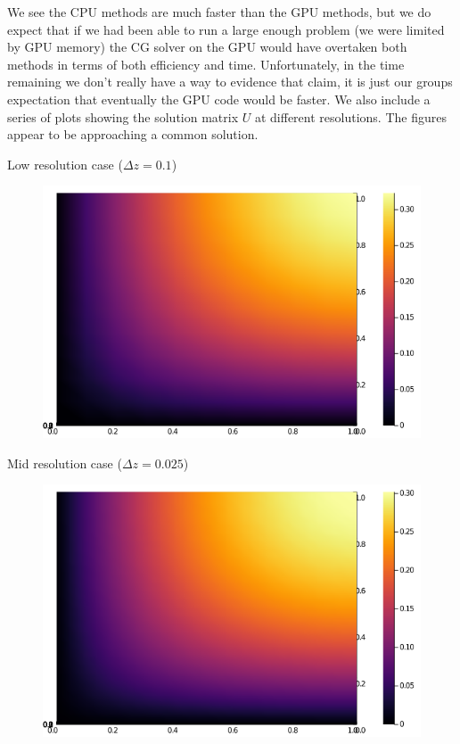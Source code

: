 \documentclass[11pt]{article}
\begin{document}
	We see the CPU methods are much faster than the GPU methods, but we do expect that if we had been able to run a large enough problem (we were limited by GPU memory) the CG solver on the GPU would have overtaken both methods in terms of both efficiency and time. Unfortunately, in the time remaining we don't really have a way to evidence that claim, it is just our groups expectation that eventually the GPU code would be faster.
	\newline\indent
	We also include a series of plots showing the solution matrix $ U $ at different resolutions. The figures appear to be approaching a common solution.

	\newpage
	\begin{center}
		Low resolution case ($ \Delta z = 0.1 $)
		\begin{figure}[hbt!]
		\centering
		    \includegraphics[scale=0.4]{2D_low_res.png}
		\end{figure}
	\end{center}
	\begin{center}
		Mid resolution case ($ \Delta z = 0.025 $)
		\begin{figure}[hbt!]
		\centering
		    \includegraphics[scale=0.4]{2D_mid_res.png}
		\end{figure}
	\end{center}
\end{document}
